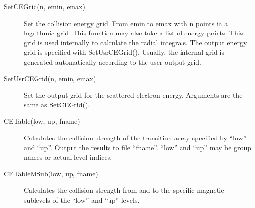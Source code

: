 \documentclass[12pt]{article}
\begin{document}
\begin{description}
\item[SetCEGrid(n, emin, emax)] 
Set the collision energy grid. From emin to emax with n points in a
logrithmic grid. This function may also take a list of energy points. This
grid is used internally to calculate the radial integrals. The output energy
grid is specified with SetUsrCEGrid(). Usually, the internal grid is generated
automatically according to the user output grid. 

\item[SetUsrCEGrid(n, emin, emax)]
Set the output grid for the scattered electron energy. Arguments are the same
as SetCEGrid().

\item[CETable(low, up, fname)] Calculates the collision strength of the
transition array specified by ``low'' and ``up''. Output the results to file
``fname''. ``low'' and ``up'' may be group names or actual level indices.

\item[CETableMSub(low, up, fname)] Calculates the collision strength from and
to the specific magnetic sublevels of the ``low'' and ``up'' levels.

\end{description}
\end{document}
